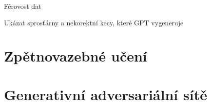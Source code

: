 \documentclass[aspectratio=169,dvipsnames]{beamer}
\begin{document}


\begin{frame}{Férovost dat}

Ukázat sprosťárny a nekorektní kecy, které GPT vygeneruje

\end{frame}


\section{Zpětnovazebné učení}


\section{Generativní adversariální sítě}




%

%


\end{document}
